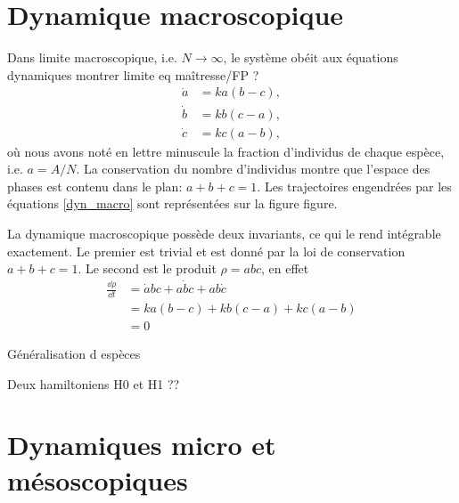\documentclass[openany,a4paper,12pt]{article}
\begin{document}
\section{Dynamique macroscopique}

\par Dans limite macroscopique, i.e. $N\rightarrow \infty$, le système obéit aux équations dynamiques {\color{red}montrer limite eq maîtresse/FP ?}
%
\begin{equation}\label{dyn_macro}
\begin{split}
	\dot a &= ka(b-c), \\
	\dot b &= kb(c-a), \\
	\dot c &= kc(a-b),
\end{split}
\end{equation}
%
où nous avons noté en lettre minuscule la fraction d'individus de chaque espèce, i.e. $a=A/N$. La conservation du nombre d'individus montre que l'espace des phases est contenu dans le plan: $a+b+c=1$. Les trajectoires engendrées par les équations \ref{dyn_macro} sont représentées sur la figure {\color{red}figure}.

\par La dynamique macroscopique possède deux invariants, ce qui le rend intégrable exactement. Le premier est trivial et est donné par la loi de conservation $a+b+c=1$. Le second est le produit $\rho = abc$, en effet
%
\begin{equation}\label{rho_invariant}
\begin{split}
	\frac{\dd \rho}{\dd t} 
	&= \dot a bc + a \dot b c + ab \dot c \\
	&= ka(b-c) + kb(c-a) + kc(a-b) \\
	&= 0
\end{split}
\end{equation}
%

{\color{red} Généralisation d espèces}

{\color{red} Deux hamiltoniens H0 et H1 ??}


\section{Dynamiques micro et mésoscopiques}
\end{document}
